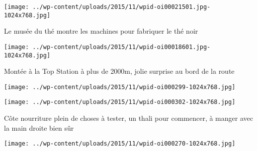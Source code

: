  

 

\begin{center} \texttt{[image: ../wp-content/uploads/2015/11/wpid-oi00021501.jpg-1024x768.jpg]} \end{center}

 

 Le musée du thé montre les machines pour fabriquer le thé noir 

 

\begin{center} \texttt{[image: ../wp-content/uploads/2015/11/wpid-oi00018601.jpg-1024x768.jpg]} \end{center}

 

 Montée à la Top Station à plus de 2000m, jolie surprise au bord de la route 

 

\begin{center} \texttt{[image: ../wp-content/uploads/2015/11/wpid-oi000299-1024x768.jpg]} \end{center}

 

 

\begin{center} \texttt{[image: ../wp-content/uploads/2015/11/wpid-oi000302-1024x768.jpg]} \end{center}

 

 Côte nourriture plein de choses à tester, un thali pour commencer, à manger avec la main droite bien sûr 

 

\begin{center} \texttt{[image: ../wp-content/uploads/2015/11/wpid-oi000270-1024x768.jpg]} \end{center}




 
 
